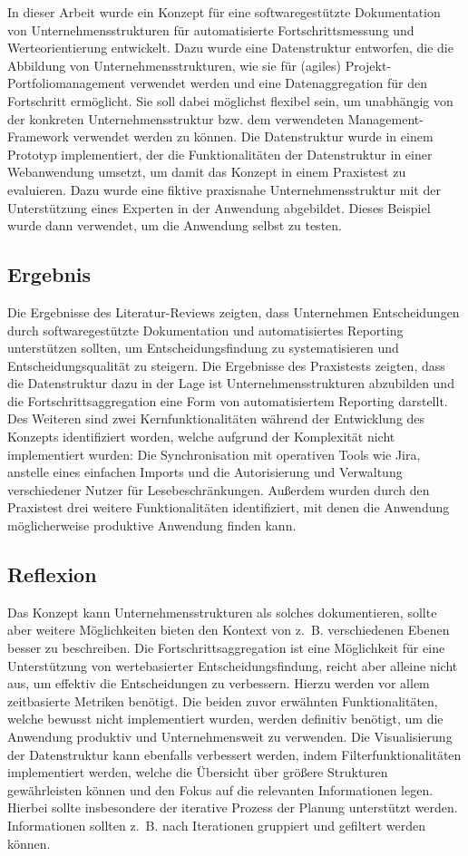 In dieser Arbeit wurde ein Konzept für eine softwaregestützte Dokumentation von Unternehmensstrukturen für automatisierte Fortschrittsmessung und Werteorientierung entwickelt. Dazu wurde eine Datenstruktur entworfen, die die Abbildung von Unternehmensstrukturen, wie sie für (agiles) Projekt-Portfoliomanagement verwendet werden und eine Datenaggregation für den Fortschritt ermöglicht. Sie soll dabei möglichst flexibel sein, um unabhängig von der konkreten Unternehmensstruktur bzw. dem verwendeten Management-Framework verwendet werden zu können. Die Datenstruktur wurde in einem Prototyp implementiert, der die Funktionalitäten der Datenstruktur in einer Webanwendung umsetzt, um damit das Konzept in einem Praxistest zu evaluieren. Dazu wurde eine fiktive praxisnahe Unternehmensstruktur mit der Unterstützung eines Experten in der Anwendung abgebildet. Dieses Beispiel wurde dann verwendet, um die Anwendung selbst zu testen.

\subsection{Ergebnis}
Die Ergebnisse des Literatur-Reviews zeigten, dass Unternehmen Entscheidungen durch softwaregestützte Dokumentation und automatisiertes Reporting unterstützen sollten, um Entscheidungsfindung zu systematisieren und Entscheidungsqualität zu steigern. Die Ergebnisse des Praxistests zeigten, dass die Datenstruktur dazu in der Lage ist Unternehmensstrukturen abzubilden und die Fortschrittsaggregation eine Form von automatisiertem Reporting darstellt. Des Weiteren sind zwei Kernfunktionalitäten während der Entwicklung des Konzepts identifiziert worden, welche aufgrund der Komplexität nicht implementiert wurden: Die Synchronisation mit operativen Tools wie Jira, anstelle eines einfachen Imports und die Autorisierung und Verwaltung verschiedener Nutzer für Lesebeschränkungen. Außerdem wurden durch den Praxistest drei weitere Funktionalitäten identifiziert, mit denen die Anwendung möglicherweise produktive Anwendung finden kann.

\subsection{Reflexion}
Das Konzept kann Unternehmensstrukturen als solches dokumentieren, sollte aber weitere Möglichkeiten bieten den Kontext von z. B. verschiedenen Ebenen besser zu beschreiben. Die Fortschrittsaggregation ist eine Möglichkeit für eine Unterstützung von wertebasierter Entscheidungsfindung, reicht aber alleine nicht aus, um effektiv die Entscheidungen zu verbessern. Hierzu werden vor allem zeitbasierte Metriken benötigt. Die beiden zuvor erwähnten Funktionalitäten, welche bewusst nicht implementiert wurden, werden definitiv benötigt, um die Anwendung produktiv und Unternehmensweit zu verwenden. Die Visualisierung der Datenstruktur kann ebenfalls verbessert werden, indem Filterfunktionalitäten implementiert werden, welche die Übersicht über größere Strukturen gewährleisten können und den Fokus auf die relevanten Informationen legen. Hierbei sollte insbesondere der iterative Prozess der Planung unterstützt werden. Informationen sollten z. B. nach Iterationen gruppiert und gefiltert werden können.

